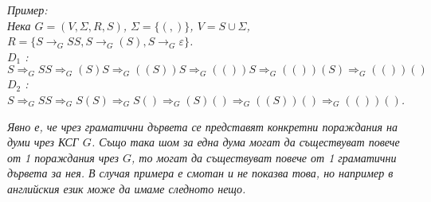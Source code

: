\documentclass[fleqn,12pt]{article}
\begin{document}
\begin{flushleft}
\begin{center}
\end{center}

\textit{Пример:\\
Нека $G = (V, \Sigma, R, S)$, $\Sigma = \{(, )\}$, $V = {S} \cup \Sigma$, $R = \{S \to_G SS, S \to_G (S), S \to_G \varepsilon\}$. \\
$D_1$ : $S \Rightarrow_G SS \Rightarrow_G (S)S \Rightarrow_G ((S))S \Rightarrow_G (())S \Rightarrow_G (())(S) \Rightarrow_G (())()$ \\
$D_2$ : $S \Rightarrow_G SS \Rightarrow_G S(S) \Rightarrow_G S() \Rightarrow_G (S)() \Rightarrow_G ((S))() \Rightarrow_G (())()$.
}

\begin{center}
\end{center}

\textit{Явно е, че чрез граматични дървета се представят конкретни пораждания на думи чрез КСГ $G$. Също така шом за една дума могат да съществуват повече от 1 пораждания чрез $G$, то могат да съществуват повече от 1 граматични дървета за нея. В случая примера е смотан и не показва това, но например в английския език може да имаме следното нещо.}

\begin{center}
\end{center}


\end{flushleft}
\end{document}
